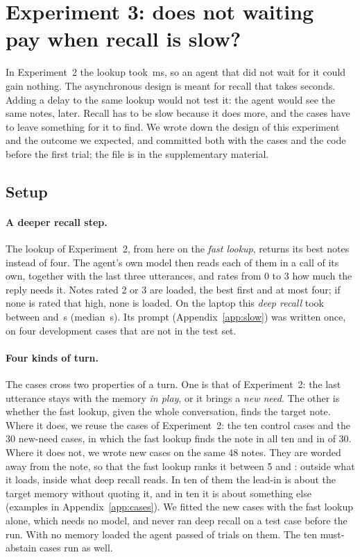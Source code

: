 \documentclass[10pt]{article}
\begin{document}
\section{Experiment 3: does not waiting pay when recall is slow?}
\label{sec:slow}

In Experiment~2 the lookup took \PreBlockMed\,ms, so an agent that did not wait for it could gain nothing. The asynchronous design is meant for recall that takes seconds. Adding a delay to the same lookup would not test it: the agent would see the same notes, later. Recall has to be slow because it does more, and the cases have to leave something for it to find. We wrote down the design of this experiment and the outcome we expected, and committed both with the cases and the code before the first trial; the file is in the supplementary material.

\subsection{Setup}

\paragraph{A deeper recall step.} The lookup of Experiment~2, from here on the \emph{fast lookup}, returns its \SCandidates{} best notes instead of four. The agent's own model then reads each of them in a call of its own, together with the last three utterances, and rates from 0 to 3 how much the reply needs it. Notes rated 2 or 3 are loaded, the best first and at most four; if none is rated that high, none is loaded. On the laptop this \emph{deep recall} took between \SJobMin{} and \SJobMax\,s (median \SJobMedMax\,s). Its prompt (Appendix~\ref{app:slow}) was written once, on four development cases that are not in the test set.

\paragraph{Four kinds of turn.} The cases cross two properties of a turn. One is that of Experiment~2: the last utterance stays with the memory \emph{in play}, or it brings a \emph{new need}. The other is whether the fast lookup, given the whole conversation, finds the target note. Where it does, we reuse the cases of Experiment~2: the ten control cases and the 30 new-need cases, in which the fast lookup finds the note in all ten and in \SGoldFastB{} of 30. Where it does not, we wrote \SNewCases{} new cases on the same 48 notes. They are worded away from the note, so that the fast lookup ranks it between 5 and \SCandidates{}: outside what it loads, inside what deep recall reads. In ten of them the lead-in is about the target memory without quoting it, and in ten it is about something else (examples in Appendix~\ref{app:cases}). We fitted the new cases with the fast lookup alone, which needs no model, and never ran deep recall on a test case before the run. With no memory loaded the agent passed \SCheckPassed{} of \SCheckTrials{} trials on them. The ten must-abstain cases run as well.
\end{document}
